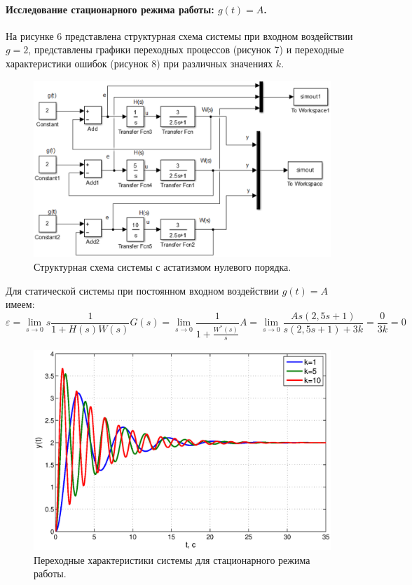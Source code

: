 \documentclass[12pt,a4paper]{article}
\begin{document}
\paragraph*{Исследование стационарного режима работы: $g(t)=A$.} 
На рисунке 6 представлена структурная схема системы при входном воздействии $g=2$, представлены графики переходных процессов (рисунок 7) и переходные характеристики ошибок (рисунок 8) при различных значениях $k$. 
\begin{figure}[H]
	\centering
	\includegraphics[width=0.8\linewidth]{cxema2.eps}
	\caption{Структурная схема системы с астатизмом нулевого порядка.}
\end{figure}
Для статической системы при постоянном входном воздействии $g(t)=A$ имеем:
\begin{equation}
    \varepsilon = \lim_{s\to0} s\frac{1}{1+H(s)W(s)}G(s) = \lim_{s\to0} \frac{1}{1+\displaystyle{\frac{W^*(s)}{s}}}A = \lim_{s\to0} \frac{As(2,5s+1)}{s(2,5s+1)+3k} = \frac{0}{3k} = 0
\end{equation}
\begin{figure}[H]
	\centering
	\includegraphics[width=1\linewidth]{2.1.1.eps}
	\caption{Переходные характеристики системы для стационарного режима работы.}
\end{figure}
\end{document}
